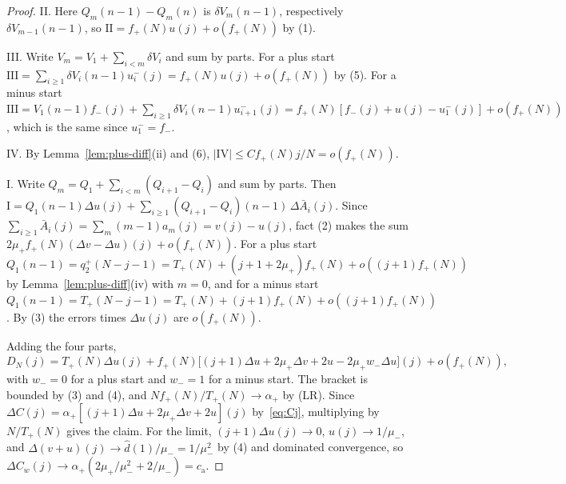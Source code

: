\begin{proof}
II. Here $Q_m(n-1)-Q_m(n)$ is $\delta V_m(n-1)$, respectively $\delta V_{m-1}(n-1)$, so
$\mathrm{II}=f_\plus(N)u(j)+o(f_\plus(N))$ by (1).

III. Write $V_m=V_1+\sum_{i<m}\delta V_i$ and sum by parts. For a plus start
$\mathrm{III}=\sum_{i\ge1}\delta V_i(n-1)u^\minus_i(j)=f_\plus(N)u(j)+o(f_\plus(N))$ by (5). For a
minus start
$\mathrm{III}=V_1(n-1)f_\minus(j)+\sum_{i\ge1}\delta V_i(n-1)u^\minus_{i+1}(j)=f_\plus(N)[f_\minus(j)+u(j)-u^\minus_1(j)]+o(f_\plus(N))$,
which is the same since $u^\minus_1=f_\minus$.

IV. By Lemma~\ref{lem:plus-diff}(ii) and (6), $|\mathrm{IV}|\le Cf_\plus(N)j/N=o(f_\plus(N))$.

I. Write $Q_m=Q_1+\sum_{i<m}(Q_{i+1}-Q_i)$ and sum by parts. Then
$\mathrm I=Q_1(n-1)\Delta u(j)+\sum_{i\ge1}(Q_{i+1}-Q_i)(n-1)\,\Delta\bar A_i(j)$. Since
$\sum_{i\ge1}\bar A_i(j)=\sum_m(m-1)a_m(j)=v(j)-u(j)$, fact (2) makes the sum
$2\mu_\plus f_\plus(N)(\Delta v-\Delta u)(j)+o(f_\plus(N))$. For a plus start
$Q_1(n-1)=q^\plus_2(N-j-1)=T_\plus(N)+(j+1+2\mu_\plus)f_\plus(N)+o((j+1)f_\plus(N))$ by
Lemma~\ref{lem:plus-diff}(iv) with $m=0$, and for a minus start
$Q_1(n-1)=T_\plus(N-j-1)=T_\plus(N)+(j+1)f_\plus(N)+o((j+1)f_\plus(N))$. By (3) the errors
times $\Delta u(j)$ are $o(f_\plus(N))$.

Adding the four parts,
\[
 D_N(j)=T_\plus(N)\Delta u(j)+f_\plus(N)\bigl[(j+1)\Delta u+2\mu_\plus\Delta v+2u-2\mu_\plus w_\minus\Delta u\bigr](j)+o(f_\plus(N)),
\]
with $w_\minus=0$ for a plus start and $w_\minus=1$ for a minus start. The bracket is bounded
by (3) and (4), and $Nf_\plus(N)/T_\plus(N)\to\alpha_\plus$ by (LR). Since
$\Delta C(j)=\alpha_\plus[(j+1)\Delta u+2\mu_\plus\Delta v+2u](j)$ by~\eqref{eq:Cj}, multiplying
by $N/T_\plus(N)$ gives the claim. For the limit, $(j+1)\Delta u(j)\to0$, $u(j)\to1/\mu_\minus$,
and $\Delta(v+u)(j)\to\hat d(1)/\mu_\minus=1/\mu_\minus^2$ by (4) and dominated convergence,
so $\Delta C_w(j)\to\alpha_\plus(2\mu_\plus/\mu_\minus^2+2/\mu_\minus)=c_{\mathrm a}$.
\end{proof}

